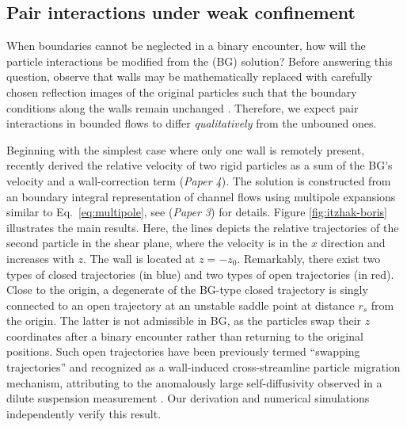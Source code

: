 \subsection{Pair interactions under weak confinement}

When boundaries cannot be neglected in a binary encounter, how will the particle interactions be modified from the \cite{batchelor_green_1972} (BG) solution?
Before answering this question, observe that walls may be mathematically replaced with carefully chosen reflection images of the original particles such that the boundary conditions along the walls remain unchanged \citep{blake_1971, LironMochon}.
Therefore, we expect pair interactions in bounded flows to differ \emph{qualitatively} from the unbouned ones.

Beginning with the simplest case where only one wall is remotely present, \cite{Fouxon_Rubinstein2019} recently derived the relative velocity of two rigid particles as a sum of the BG's velocity and a wall-correction term (\emph{Paper 4}). The solution is constructed from an boundary integral representation of channel flows using multipole expansions similar to Eq.\ \eqref{eq:multipole}, see \cite{Fouxon_2017} (\emph{Paper 3}) for details.
Figure \ref{fig:itzhak-boris} illustrates the main results.
Here, the lines depicts the relative trajectories of the second particle in the shear plane, where the velocity is in the $x$ direction and increases with $z$. The wall is located at $z=-z_0$.
Remarkably, there exist two types of closed trajectories (in blue) and two types of open trajectories (in red).
Close to the origin, a degenerate of the BG-type closed trajectory is singly connected to an open trajectory at an unstable saddle point at distance $r_s$ from the origin.
The latter is not admissible in BG, as the particles swap their $z$ coordinates after a binary encounter rather than returning to the original positions.
Such open trajectories have been previously termed ``swapping trajectories'' and recognized as a wall-induced cross-streamline particle migration mechanism, attributing to the anomalously large self-diffusivity observed in a dilute suspension measurement \citep{Zarraga_Leighton2002, zurita-gotor_2007}.
Our derivation and numerical simulations independently verify this result.

